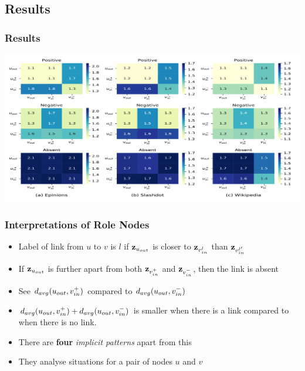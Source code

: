 \documentclass{beamer}
\begin{document}
\subsection{Results}

\begin{frame}
    \frametitle{Results}
    \label{slide:results}
     \includegraphics[width=\textwidth]{images/results.png}   

\end{frame}

 \begin{frame}
     \frametitle{Interpretations of Role Nodes}
    \begin{itemize}
        \item Label of link from $u$ to $v$ is $l$ if $\mathbf{z}_{u_{out}}$ is closer to $\mathbf{z}_{v_{in}^{l}}$ than $\mathbf{z}_{v_{in}^{l^\prime}}$
        \item If $\mathbf{z}_{u_{out}}$ is further apart from both $\mathbf{z}_{v_{in}^{+}}$ and $\mathbf{z}_{v_{in}^{-}}$, then the link is absent
        \item See $d_{avg}(u_{out},v_{in}^{+})$ compared to $d_{avg}(u_{out},v_{in}^{-})$
        \item $d_{avg}(u_{out},v_{in}^{+})+d_{avg}(u_{out},v_{in}^{-})$ is smaller when there is a link compared to when there is no link.
        \item There are \textbf{four} \textit{implicit patterns} apart from this
        \item They analyse situations for a pair of nodes $u$ and $v$ 
    \end{itemize}
\end{frame}
\end{document}
